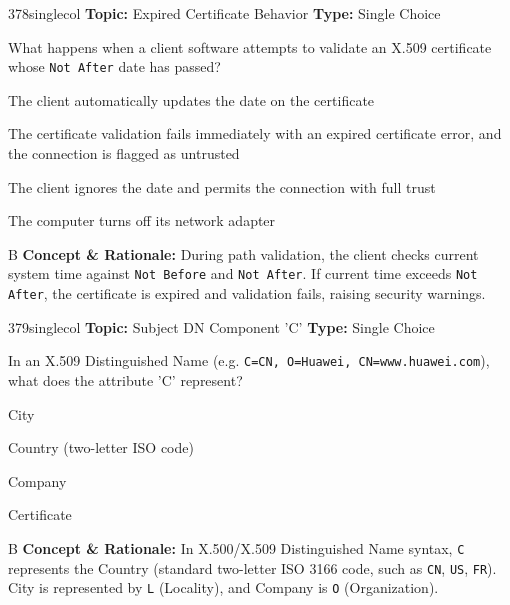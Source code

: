 \begin{qcard}{378}{singlecol}
\textcolor{darkslate!75}{\small\textbf{Topic:} Expired Certificate Behavior \hfill \textbf{Type:} Single Choice}\vspace{0.4em}\par
What happens when a client software attempts to validate an X.509 certificate whose \texttt{Not After} date has passed?
\begin{qoptions}
\item The client automatically updates the date on the certificate
\item The certificate validation fails immediately with an expired certificate error, and the connection is flagged as untrusted
\item The client ignores the date and permits the connection with full trust
\item The computer turns off its network adapter
\end{qoptions}
\end{qcard}
\nopagebreak
\begin{explainbox}{B}
\textbf{Concept \& Rationale:} During path validation, the client checks current system time against \texttt{Not Before} and \texttt{Not After}. If current time exceeds \texttt{Not After}, the certificate is expired and validation fails, raising security warnings.
\end{explainbox}

\begin{qcard}{379}{singlecol}
\textcolor{darkslate!75}{\small\textbf{Topic:} Subject DN Component 'C' \hfill \textbf{Type:} Single Choice}\vspace{0.4em}\par
In an X.509 Distinguished Name (e.g. \texttt{C=CN, O=Huawei, CN=www.huawei.com}), what does the attribute 'C' represent?
\begin{qoptions}
\item City
\item Country (two-letter ISO code)
\item Company
\item Certificate
\end{qoptions}
\end{qcard}
\nopagebreak
\begin{explainbox}{B}
\textbf{Concept \& Rationale:} In X.500/X.509 Distinguished Name syntax, \texttt{C} represents the Country (standard two-letter ISO 3166 code, such as \texttt{CN}, \texttt{US}, \texttt{FR}). City is represented by \texttt{L} (Locality), and Company is \texttt{O} (Organization).
\end{explainbox}

